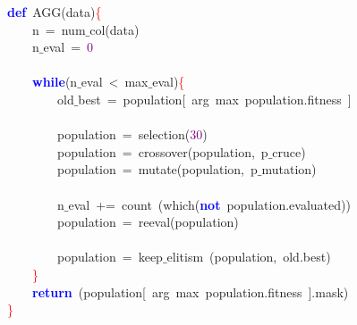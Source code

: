 \noindent
\mbox{}\textbf{\textcolor{Blue}{def}}\ AGG\textcolor{BrickRed}{(}data\textcolor{BrickRed}{)}\textcolor{Red}{\{} \\
\mbox{}\ \ \ \ n\ \textcolor{BrickRed}{=}\ num$\_$col\textcolor{BrickRed}{(}data\textcolor{BrickRed}{)} \\
\mbox{}\ \ \ \ n$\_$eval\ \textcolor{BrickRed}{=}\ \textcolor{Purple}{0} \\
\mbox{} \\
\mbox{}\ \ \ \ \textbf{\textcolor{Blue}{while}}\textcolor{BrickRed}{(}n$\_$eval\ \textcolor{BrickRed}{\textless{}}\ max$\_$eval\textcolor{BrickRed}{)}\textcolor{Red}{\{} \\
\mbox{}\ \ \ \ \ \ \ \ old$\_$best\ \textcolor{BrickRed}{=}\ population\textcolor{BrickRed}{[}\ arg\ max\ population\textcolor{BrickRed}{.}fitness\ \textcolor{BrickRed}{]} \\
\mbox{} \\
\mbox{}\ \ \ \ \ \ \ \ population\ \textcolor{BrickRed}{=}\ selection\textcolor{BrickRed}{(}\textcolor{Purple}{30}\textcolor{BrickRed}{)} \\
\mbox{}\ \ \ \ \ \ \ \ population\ \textcolor{BrickRed}{=}\ crossover\textcolor{BrickRed}{(}population\textcolor{BrickRed}{,}\ p$\_$cruce\textcolor{BrickRed}{)} \\
\mbox{}\ \ \ \ \ \ \ \ population\ \textcolor{BrickRed}{=}\ mutate\textcolor{BrickRed}{(}population\textcolor{BrickRed}{,}\ p$\_$mutation\textcolor{BrickRed}{)} \\
\mbox{} \\
\mbox{}\ \ \ \ \ \ \ \ n$\_$eval\ \textcolor{BrickRed}{+=}\ count\ \textcolor{BrickRed}{(}which\textcolor{BrickRed}{(}\textbf{\textcolor{Blue}{not}}\ population\textcolor{BrickRed}{.}evaluated\textcolor{BrickRed}{))} \\
\mbox{}\ \ \ \ \ \ \ \ population\ \textcolor{BrickRed}{=}\ reeval\textcolor{BrickRed}{(}population\textcolor{BrickRed}{)} \\
\mbox{} \\
\mbox{}\ \ \ \ \ \ \ \ population\ \textcolor{BrickRed}{=}\ keep$\_$elitism\ \textcolor{BrickRed}{(}population\textcolor{BrickRed}{,}\ old\textcolor{BrickRed}{.}best\textcolor{BrickRed}{)} \\
\mbox{}\ \ \ \ \textcolor{Red}{\}} \\
\mbox{}\ \ \ \ \textbf{\textcolor{Blue}{return}}\ \textcolor{BrickRed}{(}population\textcolor{BrickRed}{[}\ arg\ max\ population\textcolor{BrickRed}{.}fitness\ \textcolor{BrickRed}{].}mask\textcolor{BrickRed}{)} \\
\mbox{}\textcolor{Red}{\}} \\
\mbox{}
